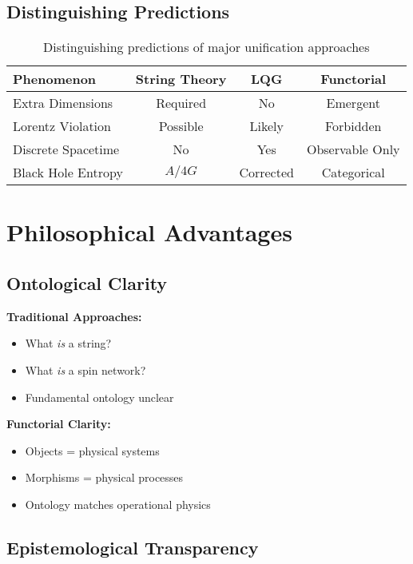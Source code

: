 \documentclass[11pt,a4paper]{article}
\begin{document}
\subsection{Distinguishing Predictions}

\begin{table}[h]
\centering
\begin{tabular}{|l|c|c|c|}
\hline
\textbf{Phenomenon} & \textbf{String Theory} & \textbf{LQG} & \textbf{Functorial} \\
\hline
Extra Dimensions & Required & No & Emergent \\
Lorentz Violation & Possible & Likely & Forbidden \\
Discrete Spacetime & No & Yes & Observable Only \\
Black Hole Entropy & $A/4G$ & Corrected & Categorical \\
\hline
\end{tabular}
\caption{Distinguishing predictions of major unification approaches}
\end{table}

\section{Philosophical Advantages}

\subsection{Ontological Clarity}

\textbf{Traditional Approaches:}
\begin{itemize}
    \item What \emph{is} a string?
    \item What \emph{is} a spin network?
    \item Fundamental ontology unclear
\end{itemize}

\textbf{Functorial Clarity:}
\begin{itemize}
    \item Objects = physical systems
    \item Morphisms = physical processes
    \item Ontology matches operational physics
\end{itemize}

\subsection{Epistemological Transparency}
\end{document}
